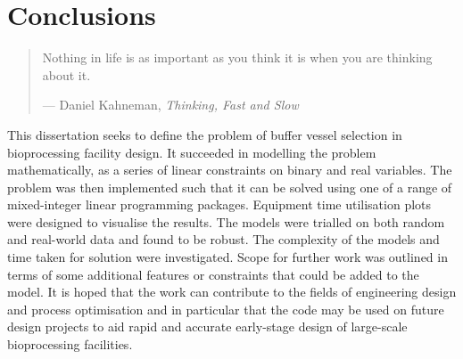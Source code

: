 %
%
%
%

\chapter{Conclusions}\label{C.conclusions}

\begin{quote}
Nothing in life is as important as you think it is when you are thinking about
it.

\hspace{2cm}--- Daniel Kahneman,
\emph{Thinking, Fast and Slow}
\end{quote}

This dissertation seeks to define the problem of buffer vessel selection in
bioprocessing facility design.
It succeeded in modelling the problem mathematically, as a series of linear
constraints on binary and real variables.
The problem was then implemented such that it can be solved using one of a
range of mixed-integer linear programming packages.
Equipment time utilisation plots were designed to visualise the results.
The models were trialled on both random and real-world data and found to be
robust.
The complexity of the models and time taken for solution were investigated.
Scope for further work was outlined in terms of some additional features or
constraints that could be added to the model.
It is hoped that the work can contribute to the fields of engineering design
and process optimisation and in particular that the code may be used on future
design projects to aid rapid and accurate early-stage design of large-scale
bioprocessing facilities.
